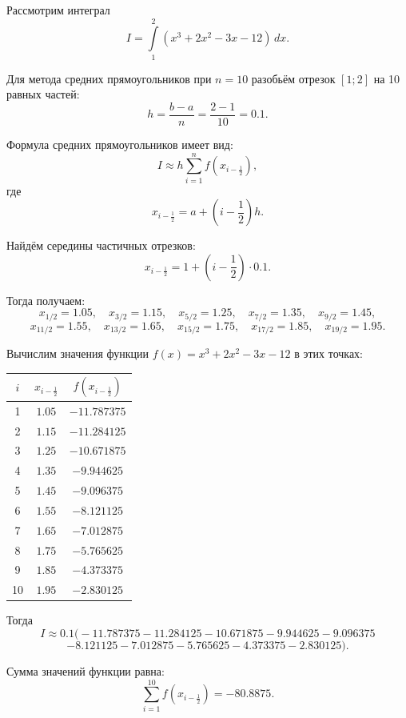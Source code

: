 \documentclass[12pt]{report}
\begin{document}
	\begin{flushleft}
		Рассмотрим интеграл
		\[
		I=\int\limits_{1}^{2}(x^3+2x^2-3x-12)\,dx.
		\]
		
		Для метода средних прямоугольников при $n=10$ разобьём отрезок $[1;2]$ на 10 равных частей:
		\[
		h=\frac{b-a}{n}=\frac{2-1}{10}=0.1.
		\]
		
		Формула средних прямоугольников имеет вид:
		\[
		I \approx h \sum_{i=1}^{n} f\left(x_{i-\frac12}\right),
		\]
		где
		\[
		x_{i-\frac12}=a+\left(i-\frac12\right)h.
		\]
		
		Найдём середины частичных отрезков:
		\[
		x_{i-\frac12}=1+\left(i-\frac12\right)\cdot 0.1.
		\]
		
		Тогда получаем:
		\[
		x_{1/2}=1.05,\quad x_{3/2}=1.15,\quad x_{5/2}=1.25,\quad x_{7/2}=1.35,\quad x_{9/2}=1.45,
		\]
		\[
		x_{11/2}=1.55,\quad x_{13/2}=1.65,\quad x_{15/2}=1.75,\quad x_{17/2}=1.85,\quad x_{19/2}=1.95.
		\]
		
		Вычислим значения функции $f(x)=x^3+2x^2-3x-12$ в этих точках:
		
		\begin{center}
			\begin{tabular}{|c|c|c|}
				\hline
				$i$ & $x_{i-\frac12}$ & $f\left(x_{i-\frac12}\right)$ \\
				\hline
				1 & $1.05$ & $-11.787375$ \\
				\hline
				2 & $1.15$ & $-11.284125$ \\
				\hline
				3 & $1.25$ & $-10.671875$ \\
				\hline
				4 & $1.35$ & $-9.944625$ \\
				\hline
				5 & $1.45$ & $-9.096375$ \\
				\hline
				6 & $1.55$ & $-8.121125$ \\
				\hline
				7 & $1.65$ & $-7.012875$ \\
				\hline
				8 & $1.75$ & $-5.765625$ \\
				\hline
				9 & $1.85$ & $-4.373375$ \\
				\hline
				10 & $1.95$ & $-2.830125$ \\
				\hline
			\end{tabular}
		\end{center}
		
		Тогда
		\[
		I \approx 0.1 \Big(
		-11.787375-11.284125-10.671875-9.944625-9.096375
		\]
		\[
		-8.121125-7.012875-5.765625-4.373375-2.830125
		\Big).
		\]
		
		Сумма значений функции равна:
		\[
		\sum_{i=1}^{10} f\left(x_{i-\frac12}\right) = -80.8875.
		\]
		

\end{flushleft}
\end{document}
